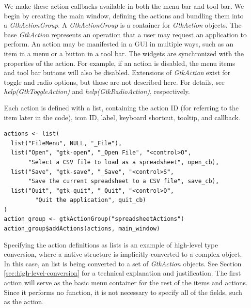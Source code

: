 \documentclass[article]{jss}
\begin{document}
We make these action callbacks available in both the
menu bar and tool bar. We begin by creating the main window, defining
the actions and bundling them into a \emph{GtkActionGroup}.  A
\emph{GtkActionGroup} is a container for \emph{GtkAction} objects. 
The base \emph{GtkAction} represents an operation that a user may
request an application to perform. An action may be manifested in a
GUI in multiple ways, such as an item in a menu or a button in a
tool bar. The widgets are synchronized with the properties of the
action. For example, if an action is disabled, the menu items and
tool bar buttons will also be disabled. Extensions of \emph{GtkAction}
exist for toggle and radio options, but those are not described here.
For details, see \emph{help(GtkToggleAction)} and \emph{help(GtkRadioAction)}, respectively.

Each action is defined with a list, containing the action ID (for referring to the item later in the code),
icon ID, label, keyboard shortcut, tooltip, and callback.
\begin{verbatim}
actions <- list(
  list("FileMenu", NULL, "_File"), 
  list("Open", "gtk-open", "_Open File", "<control>O", 
       "Select a CSV file to load as a spreadsheet", open_cb),
  list("Save", "gtk-save", "_Save", "<control>S", 
       "Save the current spreadsheet to a CSV file", save_cb),
  list("Quit", "gtk-quit", "_Quit", "<control>Q", 
         "Quit the application", quit_cb)
)
action_group <- gtkActionGroup("spreadsheetActions")
action_group$addActions(actions, main_window)
\end{verbatim}
Specifying the action definitions as  lists is an example of  high-level type conversion, where a native  structure is implicitly converted to a complex  object. In this case, an  list is being converted to a set of \emph{GtkAction}
objects. See Section \ref{sec:high-level-conversion} for
a technical explanation and justification. The first action will serve
as the basic menu container
for the rest of the items and actions. Since it performs no
function, it is not necessary to specify all of the fields,
such as the action. 
\end{document}
